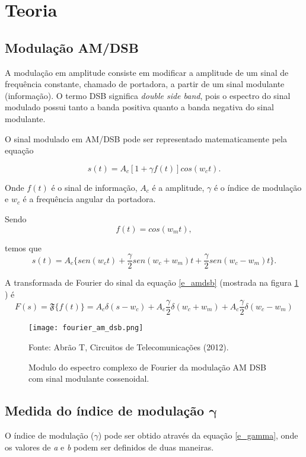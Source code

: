 \newpage
\section{Teoria}
\subsection{Modulação AM/DSB}
A modulação em amplitude consiste em modificar a amplitude de um sinal de frequência constante, chamado de portadora, a partir de um sinal modulante (informação). O termo DSB significa \textit{double side band}, pois o espectro do sinal modulado possui tanto a banda positiva quanto a banda negativa do sinal modulante.

O sinal modulado em AM/DSB pode ser representado matematicamente pela equação \cite{abrao}

\begin{equation}
s(t) = A_c[1+\gamma f(t)]cos(w_c t).
\label{e_am}
\end{equation}

Onde $f(t)$ é o sinal de informação, $A_c$ é a amplitude, $\gamma$ é o índice de modulação e $w_c$ é a frequência angular da portadora.

Sendo 
\[ f(t) = cos(w_m t), \]

temos que
\begin{equation}
s(t) = A_c  \bigg \{ sen(w_c t) + \frac{\gamma}{2}sen(w_c + w_m)t + \frac{\gamma}{2}sen(w_c - w_m)t \bigg  \} .
\label{e_amdsb}
\end{equation}

A transformada de Fourier do sinal da equação \ref{e_amdsb} (mostrada na figura \ref{f_fourier_am_dsb} ) é \cite{Couch}
\[
F(s) = \mathfrak{F} \big \{ f(t) \big \} = A_c \delta (s - w_c) + A_c \frac{\gamma}{2}\delta(w_c  + w_m) + A_c \frac{\gamma}{2}\delta(w_c  - w_m)
\]

\begin{figure}[H]
    \centering
    \caption{Modulo do espectro complexo de Fourier da modulação AM DSB com sinal modulante cossenoidal.}
    \texttt{[image: fourier\_am\_dsb.png]}
    \label{f_fourier_am_dsb}
    
    \small Fonte: Abrão T, Circuitos de Telecomunicações (2012).
\end{figure}


\subsection{Medida do índice de modulação $\bm{\gamma}$}
O índice de modulação ($\gamma$) pode ser obtido através da equação \ref{e_gamma}, onde os valores de \textit{a} e \textit{b} podem ser definidos de duas maneiras\cite{abrao}.


